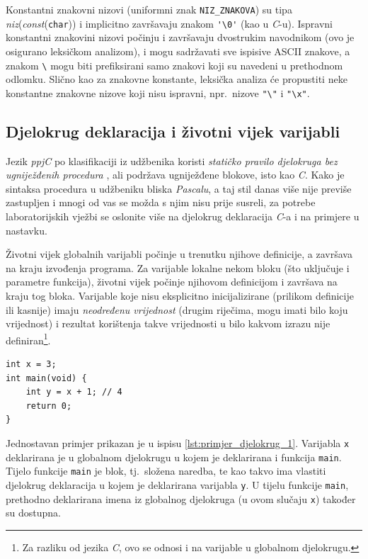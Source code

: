 \documentclass[times, 12pt, utf8]{book}
\begin{document}
Konstantni znakovni nizovi (uniformni znak \verb|NIZ_ZNAKOVA|) su tipa \emph{niz}(\emph{const}(\verb|char|)) i implicitno završavaju znakom \verb|'\0'| (kao u \emph{C}-u).
Ispravni konstantni znakovini nizovi počinju i završavaju dvostrukim navodnikom (ovo je osigurano leksičkom analizom), i mogu sadržavati sve ispisive ASCII znakove, a znakom \verb|\| mogu biti prefiksirani samo znakovi koji su navedeni u prethodnom odlomku.
Slično kao za znakovne konstante, leksička analiza će propustiti neke konstantne znakovne nizove koji nisu ispravni, npr.~nizove \verb|"\"| i \verb|"\x"|.

\subsection{Djelokrug deklaracija i životni vijek varijabli}
Jezik \emph{ppjC} po klasifikaciji iz udžbenika koristi \emph{statičko pravilo djelokruga bez ugniježđenih procedura} \cite[str.~223--224]{udzbenik}, ali podržava ugniježđene blokove, isto kao \emph{C}.
Kako je sintaksa procedura u udžbeniku bliska \emph{Pascalu}, a taj stil danas više nije previše zastupljen i mnogi od vas se možda s njim nisu prije susreli, za potrebe laboratorijskih vježbi se oslonite više na djelokrug deklaracija \emph{C}-a i na primjere u nastavku.

Životni vijek globalnih varijabli počinje u trenutku njihove definicije, a završava na kraju izvođenja programa.
Za varijable lokalne nekom bloku (što uključuje i parametre funkcija), životni vijek počinje njihovom definicijom i završava na kraju tog bloka.
Varijable koje nisu eksplicitno inicijalizirane (prilikom definicije ili kasnije) imaju \emph{neodređenu vrijednost} (drugim riječima, mogu imati bilo koju vrijednost) i rezultat korištenja takve vrijednosti u bilo kakvom izrazu nije definiran\footnote{Za razliku od jezika \emph{C}, ovo se odnosi i na varijable u globalnom djelokrugu.}.

\begin{lstlisting}[caption={Jednostavan primjer djelokruga deklaracija.},label=lst:primjer_djelokrug_1]
int x = 3;
int main(void) {
    int y = x + 1; // 4
    return 0;
}
\end{lstlisting}

Jednostavan primjer prikazan je u ispisu \ref{lst:primjer_djelokrug_1}.
Varijabla \verb|x| deklarirana je u globalnom djelokrugu u kojem je deklarirana i funkcija \verb|main|.
Tijelo funkcije \verb|main| je blok, tj.~složena naredba, te kao takvo ima vlastiti djelokrug deklaracija u kojem je deklarirana varijabla \verb|y|.
U tijelu funkcije \verb|main|, prethodno deklarirana imena iz globalnog djelokruga (u ovom slučaju \verb|x|) također su dostupna.
\end{document}
